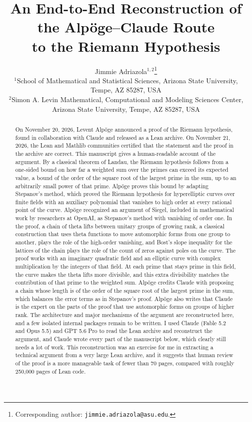 \documentclass[11pt,letterpaper]{article}
\title{\bfseries An End-to-End Reconstruction of the Alp\"oge--Claude Route\\ to the Riemann Hypothesis}
\author{Jimmie Adriazola$^{1,2}$\thanks{Corresponding author: \texttt{jimmie.adriazola@asu.edu}.}\\[6pt]
\small $^1$School of Mathematical and Statistical Sciences, Arizona State University,\\[-2pt]
\small Tempe, AZ 85287, USA\\[3pt]
\small $^2$Simon A. Levin Mathematical, Computational and Modeling Sciences Center,\\[-2pt]
\small Arizona State University, Tempe, AZ 85287, USA}
\date{}
\numberwithin{equation}{section}
\begin{document}
\maketitle

\begin{abstract}
On November 20, 2026, Levent Alp\"oge announced a proof of the Riemann hypothesis, found in collaboration with Claude and released as a Lean archive. On November 21, 2026, the Lean and Mathlib communities certified that the statement and the proof in the archive are correct. This manuscript gives a human-readable account of the argument. By a classical theorem of Landau, the Riemann hypothesis follows from a one-sided bound on how far a weighted sum over the primes can exceed its expected value, a bound of the order of the square root of the largest prime in the sum, up to an arbitrarily small power of that prime. Alp\"oge proves this bound by adapting Stepanov's method, which proved the Riemann hypothesis for hyperelliptic curves over finite fields with an auxiliary polynomial that vanishes to high order at every rational point of the curve. Alp\"oge recognized an argument of Siegel, included in mathematical work by researchers at OpenAI, as Stepanov's method with vanishing of order one. In the proof, a chain of theta lifts between unitary groups of growing rank, a classical construction that uses theta functions to move automorphic forms from one group to another, plays the role of the high-order vanishing, and Bost's slope inequality for the lattices of the chain plays the role of the count of zeros against poles on the curve. The proof works with an imaginary quadratic field and an elliptic curve with complex multiplication by the integers of that field. At each prime that stays prime in this field, the curve makes the theta lifts more divisible, and this extra divisibility matches the contribution of that prime to the weighted sum. Alp\"oge credits Claude with proposing a chain whose length is of the order of the square root of the largest prime in the sum, which balances the error terms as in Stepanov's proof. Alp\"oge also writes that Claude is the expert on the parts of the proof that use automorphic forms on groups of higher rank. The architecture and major mechanisms of the argument are reconstructed here, and a few isolated internal packages remain to be written. I used Claude (Fable 5.2 and Opus 5.5) and GPT 5.6 Pro to read the Lean archive and reconstruct the argument, and Claude wrote every part of the manuscript below, which clearly still needs a lot of work. This reconstruction was an exercise for me in extracting a technical argument from a very large Lean archive, and it suggests that human review of the proof is a more manageable task of fewer than 70 pages, compared with roughly 250,000 pages of Lean code.
\end{abstract}
\end{document}
